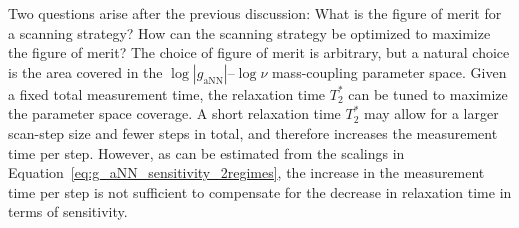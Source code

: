 Two questions arise after the previous discussion:
What is the figure of merit for a scanning strategy?
How can the scanning strategy be optimized to maximize the figure of merit?
The choice of figure of merit is arbitrary, but a natural choice is the area covered in the $\log|g_{\mathrm{aNN}}|$--$\log\nu$ mass-coupling parameter space.
Given a fixed total measurement time, the relaxation time $T_2^*$ can be tuned to maximize the parameter space coverage.
A short relaxation time $T_2^*$ may allow for a larger scan-step size and fewer steps in total, and therefore increases the measurement time per step.
However, as can be estimated from the scalings in Equation~\eqref{eq:g_aNN_sensitivity_2regimes}, the increase in the measurement time per step is not sufficient to compensate for the decrease in relaxation time in terms of sensitivity.

